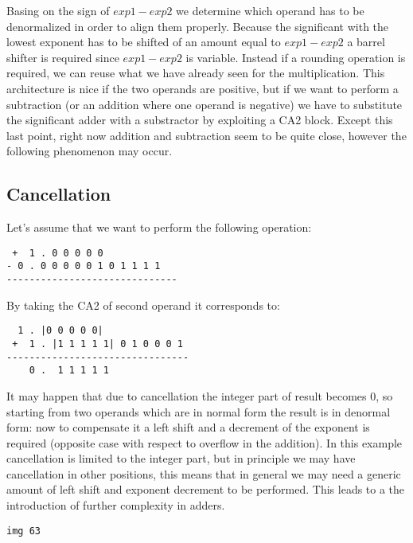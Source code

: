 Basing on the sign of $exp1-exp2$ we determine which operand has to be
denormalized in order to align them properly. Because the significant with the
lowest exponent has to be shifted of an amount equal to $exp1-exp2$ a barrel
shifter is required since $exp1-exp2$ is variable.
Instead if a rounding operation is required, we can reuse what we have already
seen for the multiplication.
This architecture is nice if the two operands are positive, but if we want to
perform a subtraction (or an addition where one operand is negative) we have to
substitute the significant adder with a substractor by exploiting a CA2 block.
Except this last point, right now addition and subtraction seem to be quite
close, however the following phenomenon may occur.

\subsection{Cancellation}
Let's assume that we want to perform the following operation:

\begin{verbatim}
 +  1 . 0 0 0 0 0
- 0 . 0 0 0 0 0 1 0 1 1 1 1
------------------------------
\end{verbatim}

By taking the CA2 of second operand it corresponds to:
\begin{verbatim}
  1 . |0 0 0 0 0|
 +  1 . |1 1 1 1 1| 0 1 0 0 0 1
--------------------------------
    0 .  1 1 1 1 1
\end{verbatim}

It may happen that due to cancellation the integer part of result becomes 0, so
starting from two operands which are in normal form the result is in denormal
form: now to compensate it a left shift and a decrement of the exponent is
required (opposite case with respect to overflow in the addition). In this
example cancellation is limited to the integer part, but in principle we may
have cancellation in other positions, this means that in general we may need a
generic amount of left shift and exponent decrement to be performed. This leads
to a the introduction of further complexity in adders.

\begin{verbatim}
img 63
















\end{verbatim}

